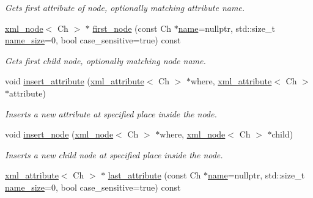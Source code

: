 \begin{DoxyCompactItemize}
\begin{DoxyCompactList}\small\item\em Gets first attribute of node, optionally matching attribute name. \end{DoxyCompactList}\item 
\mbox{\hyperlink{classrapidxml_1_1xml__node}{xml\+\_\+node}}$<$ Ch $>$ $\ast$ \mbox{\hyperlink{classrapidxml_1_1xml__node_a1290dd3cfbf7cc6384593104635c96cd}{first\+\_\+node}} (const Ch $\ast$\mbox{\hyperlink{classrapidxml_1_1xml__base_af8436e9ee14c127220113eaa956eafee}{name}}=nullptr, std\+::size\+\_\+t \mbox{\hyperlink{classrapidxml_1_1xml__base_ad01e2eff02202b130baad012d1ed7328}{name\+\_\+size}}=0, bool case\+\_\+sensitive=true) const
\begin{DoxyCompactList}\small\item\em Gets first child node, optionally matching node name. \end{DoxyCompactList}\item 
void \mbox{\hyperlink{classrapidxml_1_1xml__node_a070d5888b0557fe06a5b24961de1b988}{insert\+\_\+attribute}} (\mbox{\hyperlink{classrapidxml_1_1xml__attribute}{xml\+\_\+attribute}}$<$ Ch $>$ $\ast$where, \mbox{\hyperlink{classrapidxml_1_1xml__attribute}{xml\+\_\+attribute}}$<$ Ch $>$ $\ast$attribute)
\begin{DoxyCompactList}\small\item\em Inserts a new attribute at specified place inside the node. \end{DoxyCompactList}\item 
void \mbox{\hyperlink{classrapidxml_1_1xml__node_a780972a57fc447250ab47cc8f421b65e}{insert\+\_\+node}} (\mbox{\hyperlink{classrapidxml_1_1xml__node}{xml\+\_\+node}}$<$ Ch $>$ $\ast$where, \mbox{\hyperlink{classrapidxml_1_1xml__node}{xml\+\_\+node}}$<$ Ch $>$ $\ast$child)
\begin{DoxyCompactList}\small\item\em Inserts a new child node at specified place inside the node. \end{DoxyCompactList}\item 
\mbox{\hyperlink{classrapidxml_1_1xml__attribute}{xml\+\_\+attribute}}$<$ Ch $>$ $\ast$ \mbox{\hyperlink{classrapidxml_1_1xml__node_aac6275f8fc7ce79f9a7732240cf1428c}{last\+\_\+attribute}} (const Ch $\ast$\mbox{\hyperlink{classrapidxml_1_1xml__base_af8436e9ee14c127220113eaa956eafee}{name}}=nullptr, std\+::size\+\_\+t \mbox{\hyperlink{classrapidxml_1_1xml__base_ad01e2eff02202b130baad012d1ed7328}{name\+\_\+size}}=0, bool case\+\_\+sensitive=true) const

\end{DoxyCompactItemize}
